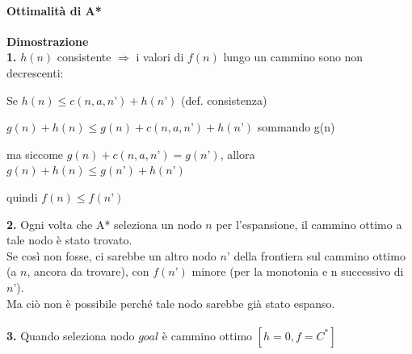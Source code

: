 \documentclass[10pt]{book}
\begin{document}
\paragraph{Ottimalità di A*} \textbf{Dimostrazione}\\
\textbf{1.} $h(n)$ consistente $\Rightarrow$ i valori di $f(n)$ lungo un cammino sono non decrescenti:
\begin{list}{}{}
	\item Se $h(n) \leq c(n, a, n’) + h(n’)$ (def. consistenza)
	\item $g(n) + h(n) \leq g(n) + c(n, a, n’) + h(n’)$ sommando g(n)
	\item ma siccome $g(n) + c(n, a, n’) = g(n’)$, allora $g(n) + h(n) \leq g(n’) + h(n’)$
	\item quindi $f(n) \leq f(n’)$
\end{list}
\textbf{2.} Ogni volta che A* seleziona un nodo $n$ per l’espansione, il
cammino ottimo a tale nodo è stato trovato.\\
Se così non fosse, ci sarebbe un altro nodo $n’$ della frontiera sul cammino ottimo (a $n$, ancora da trovare), con $f(n’)$ minore (per la monotonia e n successivo di $n’$).\\
Ma ciò non è possibile perché tale nodo sarebbe già stato espanso.\\\\
\textbf{3.} Quando seleziona nodo $goal$ è cammino ottimo $[h=0, f=C^*]$
\end{document}
